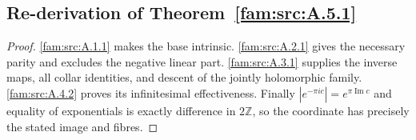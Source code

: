 \subsection{Re-derivation of Theorem~\ref{fam:src:A.5.1}}\label{app:rederive:fam-src-A.5.1}
\begin{proof}
\ref{fam:src:A.1.1} makes the base intrinsic. \ref{fam:src:A.2.1} gives the necessary parity and excludes the negative linear part. \ref{fam:src:A.3.1} supplies the inverse maps, all collar identities, and descent of the jointly holomorphic family. \ref{fam:src:A.4.2} proves its infinitesimal effectiveness. Finally $|e^{-\pi ic}|=e^{\pi\operatorname{Im}c}$ and equality of exponentials is exactly difference in $2\mathbb Z$, so the coordinate has precisely the stated image and fibres.
\end{proof}

